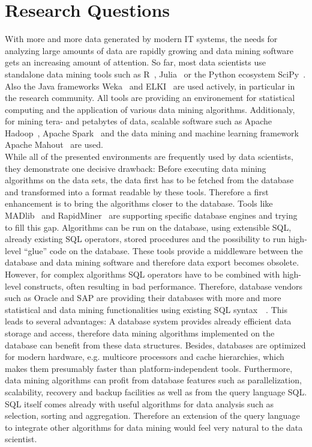 \section{Research Questions}
With more and more data generated by modern IT systems, the needs for analyzing large amounts of data are rapidly growing and data mining software gets an increasing amount of attention. So far, most data scientists use standalone data mining tools such as R~\parencite{R/stats}, Julia~\parencite{DBLP:journals/corr/abs-1209-5145} or the Python ecosystem SciPy~\parencite{scipy}. Also the Java frameworks Weka~\parencite{Hall:2009:WDM:1656274.1656278} and ELKI~\parencite{DBLP:conf/ssdbm/AchtertKZ08} are used actively, in particular in the research community. All tools are providing an environement for statistical computing and the application of various data mining algorithms. Additionaly, for mining tera- and petabytes of data, scalable software such as Apache Hadoop~\parencite{hadoop}, Apache Spark~\parencite{spark} and the data mining and machine learning framework Apache Mahout~\parencite{mahout} are used.
\\
While all of the presented environments are frequently used by data scientists, they demonstrate one decisive drawback: Before executing data mining algorithms on the data sets, the data first has to be fetched from the database and transformed into a format readable by these tools. Therefore a first enhancement is to bring the algorithms closer to the database. Tools like MADlib~\parencite{MADlib} and RapidMiner~\parencite{RapidMiner} are supporting specific database engines and trying to fill this gap. Algorithms can be run on the database, using extensible SQL, already existing SQL operators, stored procedures and the possibility to run high-level \enquote{glue} code on the database. These tools provide a middleware between the database and data mining software and therefore data export becomes obsolete. 
\\
However, for complex algorithms SQL operators have to be combined with high-level constructs, often resulting in bad performance. Therefore, database vendors such as Oracle and SAP are providing their databases with more and more statistical and data mining functionalities using existing SQL syntax~\parencite{oracle}~\parencite{SAP}. This leads to several advantages: A database system provides already efficient data storage and access, therefore data mining algorithms implemented on the database can benefit from these data structures. Besides, databases are optimized for modern hardware, e.g. multicore processors and cache hierarchies, which makes them presumably faster than platform-independent tools. Furthermore, data mining algorithms can profit from database features such as parallelization, scalability, recovery and backup facilities as well as from the query language SQL. SQL itself comes already with useful algorithms for data analysis such as selection, sorting and aggregation. Therefore an extension of the query language to integrate other algorithms for data mining would feel very natural to the data scientist. 
